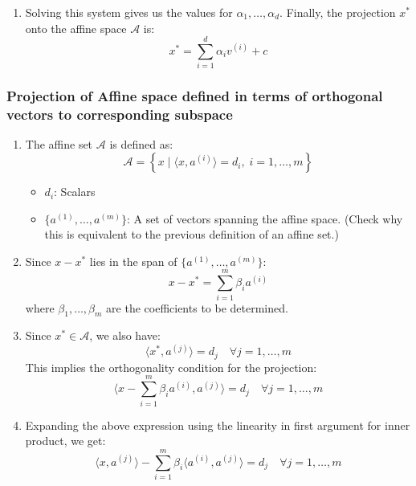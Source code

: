 \begin{derivation}
\begin{enumerate}
                \item Solving this system gives us the values for $\alpha_1, \dots, \alpha_d$. Finally, the projection $x^*$ onto the affine space $\mathcal{A}$ is:
                \[
                x^* = \sum_{i=1}^{d} \alpha_i v^{(i)} + c
                \]
            \end{enumerate}
        \end{derivation}

        \subsubsection{Projection of Affine space defined in terms of orthogonal vectors to corresponding subspace}
        \begin{derivation}
            \begin{enumerate}
                \item The affine set $\mathcal{A}$ is defined as:
                \[
                \mathcal{A} = \left\{ x \mid \langle x, a^{(i)} \rangle = d_i, \; i = 1, \dots, m \right\}
                \]
                \begin{itemize}
                    \item $d_i$: Scalars
                    \item $\{a^{(1)}, \dots, a^{(m)}\}$: A set of vectors spanning the affine space. (Check why this is equivalent to the previous definition of an affine set.)
                \end{itemize}
                
                \item Since $x-x^*$ lies in the span of $\{a^{(1)}, \dots, a^{(m)}\}$:
                \[
                x - x^* = \sum_{i=1}^{m} \beta_i a^{(i)}
                \]
                where $\beta_1, \dots, \beta_m$ are the coefficients to be determined.
                
                \item Since $x^* \in \mathcal{A}$, we also have:
                \[
                \langle x^*, a^{(j)} \rangle = d_j \quad \forall j = 1, \dots, m
                \]
                This implies the orthogonality condition for the projection:
                \[
                \langle x - \sum_{i=1}^{m} \beta_i a^{(i)}, a^{(j)} \rangle = d_j \quad \forall j = 1, \dots, m
                \]
            
                \item Expanding the above expression using the linearity in first argument for inner product, we get:
                \[
                \langle x, a^{(j)} \rangle - \sum_{i=1}^{m} \beta_i \langle a^{(i)}, a^{(j)} \rangle = d_j \quad \forall j = 1, \dots, m
                \]
                

\end{enumerate}
\end{derivation}
